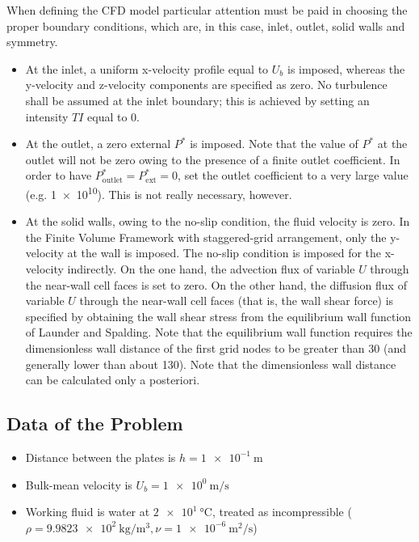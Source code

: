 \documentclass[12pt]{article}
\begin{document}
                When defining the CFD model particular attention must be paid in choosing the proper boundary conditions, which are, in this case, inlet, outlet, solid walls and symmetry.

                \begin{itemize}
                        \item At the inlet, a uniform x-velocity profile equal to \( U_b \) is imposed, whereas the y-velocity and z-velocity components are specified as zero. No turbulence shall be assumed at the inlet boundary; this is achieved by setting an intensity \( TI \) equal to 0.
                        \item At the outlet, a zero external \( P^* \) is imposed. Note that the value of \( P^* \) at the outlet will not be zero owing to the presence of a finite outlet coefficient. In order to have \(P_{\text{outlet}}^* = P_{\text{ext}}^* = 0\), set the outlet coefficient to a very large value (e.g. \num{1e+10}). This is not really necessary, however.
                        \item At the solid walls, owing to the no-slip condition, the fluid velocity is zero. In the Finite Volume Framework with staggered-grid arrangement, only the y-velocity at the wall is imposed. The no-slip condition is imposed for the x-velocity indirectly. On the one hand, the advection flux of variable \( U \) through the near-wall cell faces is set to zero. On the other hand, the diffusion flux of variable \( U \) through the near-wall cell faces (that is, the wall shear force) is specified by obtaining the wall shear stress from the equilibrium wall function of Launder and Spalding. Note that the equilibrium wall function requires the dimensionless wall distance of the first grid nodes to be greater than 30 (and generally lower than about 130). Note that the dimensionless wall distance can be calculated only a posteriori.
                \end{itemize}
        
        \subsection{Data of the Problem}

                \begin{itemize}
                        \item Distance between the plates is \( h = \SI{1e-1}{\metre} \)
                        \item Bulk-mean velocity is \( U_b = \SI{1e0}{\metre \per \second} \)
                        \item Working fluid is water at \( \SI{2e1}{\celsius} \), treated as incompressible (\( \rho = \SI{9.9823e2}{\kilogram \per \metre \cubed} , \nu = \SI{1e-6}{\metre \squared \per \second} \))
                \end{itemize}
        
\end{document}
